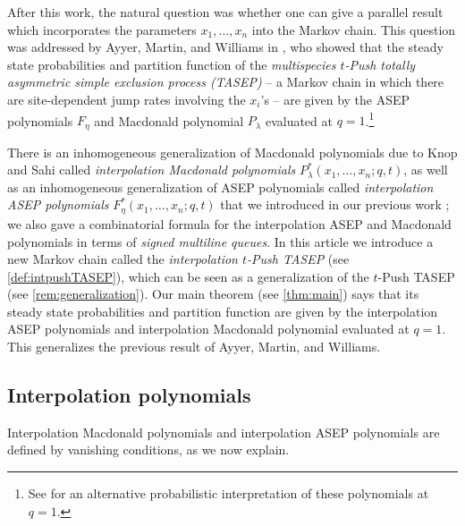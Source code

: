 \documentclass[12pt]{amsart}
\theoremstyle{definition}
\begin{document}
After this work, the natural question was whether one can give a parallel result which incorporates the parameters $x_1,\dots,x_n$ into the Markov chain.  This question was addressed by Ayyer, Martin, and Williams 
in   \cite{AyyerMartinWilliams2025}, who showed that the steady state probabilities and partition function of the  \emph{multispecies $t$-Push totally asymmetric simple exclusion process (TASEP)} -- a Markov chain in which there are site-dependent jump rates involving the $x_i$'s -- are given by the ASEP polynomials $F_{\eta}$ and Macdonald polynomial $P_{\lambda}$ evaluated at $q=1$.\footnote{See \cite{Defant2024} for an alternative probabilistic interpretation of these polynomials at $q=1$.}

There is an inhomogeneous generalization of Macdonald polynomials due to Knop and Sahi \cite{Knop1997b, Sahi1996} called \emph{interpolation Macdonald polynomials} $P^*_{\lambda}(x_1,\dots,x_n;q,t)$, as well as an inhomogeneous generalization of ASEP polynomials called \emph{interpolation ASEP polynomials} $F^*_{\eta}(x_1,\dots,x_n;q,t)$ that we introduced in our previous work \cite{BenDaliWilliams2025}; we also gave a combinatorial formula for the interpolation ASEP and Macdonald polynomials in terms of \emph{signed multiline queues}.  
In this article 
we introduce a new Markov chain called the \emph{interpolation $t$-Push TASEP}
(see \cref{def:intpushTASEP}), which can be seen as a generalization of the $t$-Push TASEP (see \cref{rem:generalization}).  Our main theorem (see \cref{thm:main}) says that its steady state probabilities and partition function are given by the interpolation ASEP polynomials and interpolation Macdonald polynomial evaluated at $q=1$.  This generalizes the previous result of Ayyer, Martin, and Williams.




\subsection{Interpolation polynomials}
Interpolation Macdonald polynomials and interpolation ASEP polynomials are defined by vanishing conditions, as we now explain.
\end{document}
